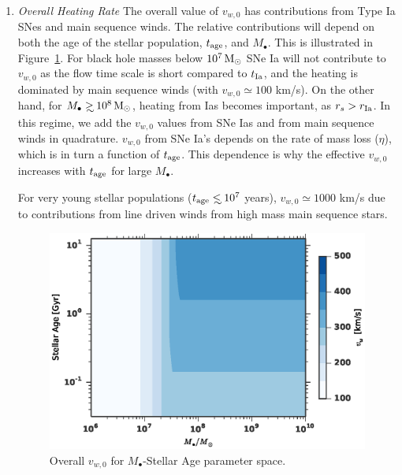 \documentclass[usenatbib,fleqn]{mn2e}
\newcommand\lsim{\mathrel{\rlap{\lower4pt\hbox{\hskip1pt$\sim$}}
        \raise1pt\hbox{$<$}}}
\newcommand\gsim{\mathrel{\rlap{\lower4pt\hbox{\hskip1pt$\sim$}}
        \raise1pt\hbox{$>$}}}
\newcommand{\rs}{r_s}
\newcommand{\Mbh}[1][]{M_{\bullet#1}}
\newcommand{\rIa}{r_{\rm Ia}}
\newcommand{\vwO}{v_{w,0}}
\newcommand{\tage}{t_{\rm age}}
\begin{document}
\begin{enumerate}
\item \emph{Overall Heating Rate} The overall value of $\vwO$ has
  contributions from Type Ia SNes and main sequence winds.  The
  relative contributions will depend on both the age of the stellar
  population, $\tage$, and $\Mbh$.  This is illustrated in
  Figure~\ref{fig:vweff}. For black hole masses below $10^7 \,{\rm M_\odot}$ SNe
  Ia will not contribute to $\vwO$ as the flow time scale is short
  compared to $t_{\rm Ia}$, and the heating is dominated by main
  sequence winds (with $\vwO\simeq 100$ km/s).  On the other hand, for
  $\Mbh \gsim 10^8 \Msun$, heating from Ias becomes important, as
  $\rs>\rIa$.  In this regime, we add the $\vwO$ values from SNe Ias
  and from main sequence winds in quadrature. $\vwO$ from SNe Ia's
  depends on the rate of mass loss ($\eta$), which is in turn a
  function of $t_{\rm age}$. This dependence is why the effective
  $\vwO$ increases with $\tage$ for large $\Mbh$.

For very young stellar populations ($\tage \lsim 10^7$ years),
$\vwO\simeq 1000$ km/s due to contributions from line driven winds
from high mass main sequence stars.

\begin{figure}
\includegraphics[width=\columnwidth]{vw-contour.eps}
\caption{\label{fig:vweff} Overall $\vwO$ for $\Mbh$-Stellar Age parameter space.}
\end{figure}

\end{enumerate}
\end{document}
